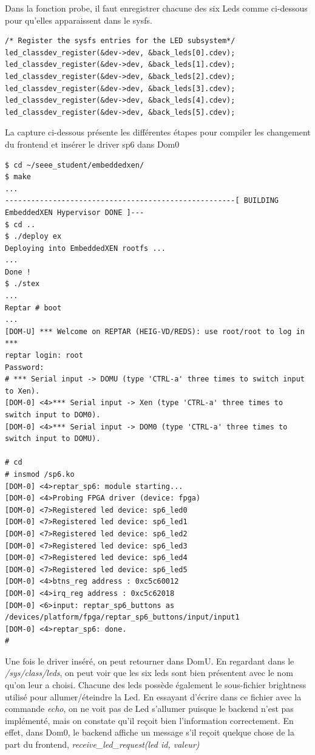 Dans la fonction probe, il faut enregistrer chacune des six Leds comme ci-dessous pour qu'elles apparaissent dans le sysfs.
\begin{lstlisting}
/* Register the sysfs entries for the LED subsystem*/
led_classdev_register(&dev->dev, &back_leds[0].cdev);
led_classdev_register(&dev->dev, &back_leds[1].cdev);
led_classdev_register(&dev->dev, &back_leds[2].cdev);
led_classdev_register(&dev->dev, &back_leds[3].cdev);
led_classdev_register(&dev->dev, &back_leds[4].cdev);
led_classdev_register(&dev->dev, &back_leds[5].cdev);
\end{lstlisting}
La capture ci-dessous présente les différentes étapes pour compiler les changement du frontend et insérer le driver sp6 dans Dom0
\begin{lstlisting}
$ cd ~/seee_student/embeddedxen/
$ make
...
-----------------------------------------------------[ BUILDING EmbeddedXEN Hypervisor DONE ]---
$ cd ..
$ ./deploy ex
Deploying into EmbeddedXEN rootfs ...
...
Done !
$ ./stex
...
Reptar # boot
...
[DOM-U] *** Welcome on REPTAR (HEIG-VD/REDS): use root/root to log in ***
reptar login: root
Password: 
# *** Serial input -> DOMU (type 'CTRL-a' three times to switch input to Xen).
[DOM-0] <4>*** Serial input -> Xen (type 'CTRL-a' three times to switch input to DOM0).
[DOM-0] <4>*** Serial input -> DOM0 (type 'CTRL-a' three times to switch input to DOMU).

# cd
# insmod /sp6.ko
[DOM-0] <4>reptar_sp6: module starting...
[DOM-0] <4>Probing FPGA driver (device: fpga)
[DOM-0] <7>Registered led device: sp6_led0
[DOM-0] <7>Registered led device: sp6_led1
[DOM-0] <7>Registered led device: sp6_led2
[DOM-0] <7>Registered led device: sp6_led3
[DOM-0] <7>Registered led device: sp6_led4
[DOM-0] <7>Registered led device: sp6_led5
[DOM-0] <4>btns_reg address : 0xc5c60012
[DOM-0] <4>irq_reg address : 0xc5c62018
[DOM-0] <6>input: reptar_sp6_buttons as /devices/platform/fpga/reptar_sp6_buttons/input/input1
[DOM-0] <4>reptar_sp6: done.
#
\end{lstlisting}
Une fois le driver inséré, on peut retourner dans DomU. En regardant dans le \textit{/sys/class/leds}, on peut voir que les six leds sont bien présentent avec le nom qu'on leur a choisi. Chacune des leds possède également le sous-fichier brightness utilisé pour allumer/éteindre la Led.
En essayant d'écrire dans ce fichier avec la commande \textit{echo}, on ne voit pas de Led s'allumer puisque le backend n'est pas implémenté, mais on constate qu'il reçoit bien l'information correctement. En effet, dans Dom0, le backend affiche un message s'il reçoit quelque chose de la part du frontend, \textit{receive\_led\_request(led id, valeur)}

